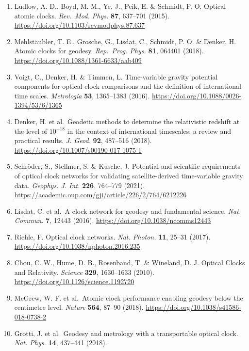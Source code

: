 \documentclass[
  12pt,
  a4paper,
]{article}
\providecommand{\tightlist}{%
  \setlength{\itemsep}{0pt}\setlength{\parskip}{0pt}}
\begin{document}
\begin{enumerate}
\def\labelenumi{\arabic{enumi}.}
\tightlist
\item
  Ludlow, A. D., Boyd, M. M., Ye, J., Peik, E. \& Schmidt, P. O. Optical
  atomic clocks. \emph{Rev.~Mod. Phys.} \textbf{87}, 637--701 (2015).
  \url{https://doi.org/10.1103/revmodphys.87.637}
\item
  Mehlstäubler, T. E., Grosche, G., Lisdat, C., Schmidt, P. O. \&
  Denker, H. Atomic clocks for geodesy. \emph{Rep.~Prog. Phys.}
  \textbf{81}, 064401 (2018).
  \url{https://doi.org/10.1088/1361-6633/aab409}
\item
  Voigt, C., Denker, H. \& Timmen, L. Time-variable gravity potential
  components for optical clock comparisons and the definition of
  international time scales. \emph{Metrologia} \textbf{53}, 1365--1383
  (2016). \url{https://doi.org/10.1088/0026-1394/53/6/1365}
\item
  Denker, H. et al.~Geodetic methods to determine the relativistic
  redshift at the level of \(10^{-18}\) in the context of international
  timescales: a review and practical results. \emph{J. Geod.}
  \textbf{92}, 487--516 (2018).
  \url{https://doi.org/10.1007/s00190-017-1075-1}
\item
  Schröder, S., Stellmer, S. \& Kusche, J. Potential and scientific
  requirements of optical clock networks for validating
  satellite-derived time-variable gravity data. \emph{Geophys. J. Int.}
  \textbf{226}, 764--779 (2021).
  \url{https://academic.oup.com/gji/article/226/2/764/6212226}
\item
  Lisdat, C. et al.~A clock network for geodesy and fundamental science.
  \emph{Nat. Commun.} \textbf{7}, 12443 (2016).
  \url{https://doi.org/10.1038/ncomms12443}
\item
  Riehle, F. Optical clock networks. \emph{Nat. Photon.} \textbf{11},
  25--31 (2017). \url{https://doi.org/10.1038/nphoton.2016.235}
\item
  Chou, C. W., Hume, D. B., Rosenband, T. \& Wineland, D. J. Optical
  Clocks and Relativity. \emph{Science} \textbf{329}, 1630--1633 (2010).
  \url{https://doi.org/10.1126/science.1192720}
\item
  McGrew, W. F. et al.~Atomic clock performance enabling geodesy below
  the centimetre level. \emph{Nature} \textbf{564}, 87--90 (2018).
  \url{https://doi.org/10.1038/s41586-018-0738-2}
\item
  Grotti, J. et al.~Geodesy and metrology with a transportable optical
  clock. \emph{Nat. Phys.} \textbf{14}, 437--441 (2018).

\end{enumerate}
\end{document}
